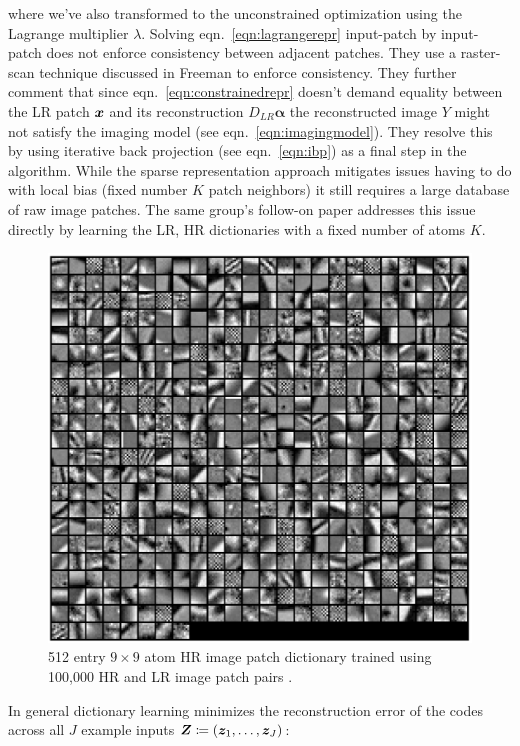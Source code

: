 where we've also transformed to the unconstrained optimization using the Lagrange multiplier \(\lambda\).
%
Solving eqn.~\eqref{eqn:lagrangerepr} input-patch by input-patch does not enforce consistency between adjacent patches.
%
They use a raster-scan technique discussed in Freeman \etal \cite{freeman2002example} to enforce consistency.
%
They further comment that since eqn.~\eqref{eqn:constrainedrepr} doesn't demand equality between the LR patch \(\bm{x}\) and its reconstruction \(D_{LR}\bm{\alpha}\) the reconstructed image \(Y\) might not satisfy the imaging model (see eqn.~\eqref{eqn:imagingmodel}).
%
They resolve this by using iterative back projection (see eqn.~\eqref{eqn:ibp}) as a final step in the algorithm.
%
While the sparse representation approach mitigates issues having to do with local bias (fixed number \(K\) patch neighbors) it still requires a large database of raw image patches.
%
The same group's follow-on paper \cite{yang2010} addresses this issue directly by learning the LR, HR dictionaries with a fixed number of atoms \(K\).
\begin{figure}
    \centering
    \includegraphics[width=\linewidth,keepaspectratio]{figures/classical/dictpatches.png}
    \caption{512 entry \(9 \times 9\) atom HR image patch dictionary trained using 100,000 HR and LR image patch pairs \cite{yang2010}.}
    \label{fig:hrpatchdict}
\end{figure}
%
In general dictionary learning minimizes the reconstruction error of the codes across all \(J\) example inputs \(\bm{Z} \coloneqq \left( \bm{z}_1, \mathellipsis, \bm{z}_J \right)\):
